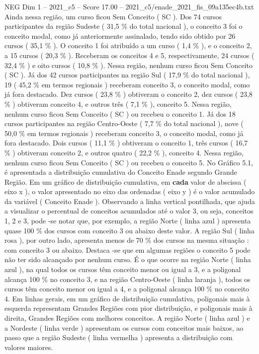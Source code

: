 \begin{textsample}{NEG Dim 1 – 2021\_c5 – Score 17.00 – 2021\_c5/enade\_2021\_fis\_09a135ec4b.txt}
Ainda nessa região, um curso ficou Sem Conceito ( SC ).
Dos 74 cursos participantes da região Sudeste ( 31,5 \% do total nacional ), o conceito 3 foi o conceito modal, como já anteriormente assinalado, tendo sido obtido por 26 cursos ( 35,1 \% ).
O conceito 1 foi atribuído a um curso ( 1,4 \% ), e o conceito 2, a 15 cursos ( 20,3 \% ).
Receberam os conceitos 4 e 5, respectivamente, 24 cursos ( 32,4 \% ) e oito cursos ( 10,8 \% ).
Nessa região, nenhum curso ficou Sem Conceito ( SC ).
Já dos 42 cursos participantes na região Sul ( 17,9 \% do total nacional ), 19 ( 45,2 \% em termos regionais ) receberam conceito 3, o conceito modal, como já fora destacado.
Dez cursos ( 23,8 \% ) obtiveram o conceito 2, dez cursos ( 23,8 \% ) obtiveram conceito 4, e outros três ( 7,1 \% ), conceito 5.
Nessa região, nenhum curso ficou Sem Conceito ( SC ) ou recebeu o conceito 1.
Já dos 18 cursos participantes na região Centro-Oeste ( 7,7 \% do total nacional ), nove ( 50,0 \% em termos regionais ) receberam conceito 3, o conceito modal, como já fora destacado.
Dois cursos ( 11,1 \% ) obtiveram o conceito 1, três cursos ( 16,7 \% ) obtiveram conceito 2, e outros quatro ( 22,2 \% ), conceito 4.
Nessa região, nenhum curso ficou Sem Conceito ( SC ) ou recebeu o conceito 5.
No Gráfico 5.1, é apresentada a distribuição cumulativa do Conceito Enade segundo Grande Região.
Em um gráfico de distribuição cumulativa, em \textbf{cada} valor de abscissa ( eixo x ), o valor apresentado no eixo das ordenadas ( eixo y ) é o valor acumulado da variável ( Conceito Enade ).
Observando a linha vertical pontilhada, que ajuda a visualizar o percentual de conceitos acumulados até o valor 3, ou seja, conceitos 1, 2 e 3, pode -se notar que, por exemplo, a região Norte ( linha azul ) apresenta quase 100 \% dos cursos com conceito 3 ou abaixo deste valor.
A região Sul ( linha rosa ), por outro lado, apresenta menos de 70 \% dos cursos na mesma situação : com conceito 3 ou abaixo.
Destaca -se que em algumas regiões o conceito 5 pode não ter sido alcançado por nenhum curso.
É o que ocorre na região Norte ( linha azul ), na qual todos os cursos têm conceito menor ou igual a 3, e a poligonal alcança 100 \% no conceito 3, e na região Centro-Oeste ( linha laranja ), todos os cursos têm conceito menor ou igual a 4, e a poligonal alcança 100 \% no conceito 4.
Em linhas gerais, em um gráfico de distribuição cumulativa, poligonais mais à esquerda representam Grandes Regiões com pior distribuição, e poligonais mais à direita, Grandes Regiões com melhores conceitos.
A região Norte ( linha azul ) e a Nordeste ( linha verde ) apresentam os cursos com conceitos mais baixos, ao passo que a região Sudeste ( linha vermelha ) apresenta a distribuição com valores maiores.

\end{textsample}
